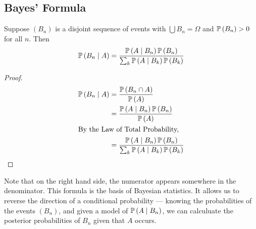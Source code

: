 \subsection{Bayes' Formula}
\begin{claim}
	Suppose \((B_n)\) is a disjoint sequence of events with \(\bigcup B_n = \Omega\) and \(\mathbb{P}\left({B_n}\right) > 0\) for all \(n\).
	Then
	\[
		\mathbb{P}\left({B_n \mid A}\right) = \frac{\mathbb{P}\left({A \mid B_n}\right) \mathbb{P}\left({B_n}\right)}{\sum_k \mathbb{P}\left({A \mid B_k}\right) \mathbb{P}\left({B_k}\right)}
	\]
\end{claim}
\begin{proof}
	\begin{align*}
		\mathbb{P}\left({B_n \mid A}\right) & = \frac{\mathbb{P}\left({B_n \cap A}\right)}{\mathbb{P}\left({A}\right)}                                       \\
		                  & = \frac{\mathbb{P}\left({A \mid B_n}\right) \mathbb{P}\left({B_n}\right)}{\mathbb{P}\left({A}\right)}                            \\
		\intertext{By the Law of Total Probability,}
		                  & = \frac{\mathbb{P}\left({A \mid B_n}\right) \mathbb{P}\left({B_n}\right)}{\sum_k \mathbb{P}\left({A \mid B_k}\right) \mathbb{P}\left({B_k}\right)}
	\end{align*}
\end{proof}
\noindent Note that on the right hand side, the numerator appears somewhere in the denominator.
This formula is the basis of Bayesian statistics.
It allows us to reverse the direction of a conditional probability --- knowing the probabilities of the events \((B_n)\), and given a model of \(\mathbb{P}\left({A \mid B_n}\right)\), we can calculuate the posterior probabilities of \(B_n\) given that \(A\) occurs.
